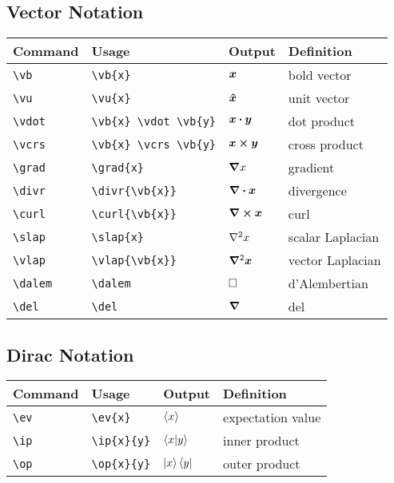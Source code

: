 \documentclass[11pt]{article}
\begin{document}
\subsection{Vector Notation}

\begin{tabular}{llll}
    Command       & Usage                      & Output                & Definition       \\
    \hline
    \verb|\vb|    & \verb|\vb{x}|              & $\bm{x}$              & bold vector      \\
    \verb|\vu|    & \verb|\vu{x}|              & $\bm{\hat{x}}$              & unit vector      \\
    \verb|\vdot|  & \verb|\vb{x} \vdot \vb{y}| & $\bm{x} \bm{\cdot} \bm{y}$ & dot product      \\
    \verb|\vcrs|  & \verb|\vb{x} \vcrs \vb{y}| & $\bm{x} \bm{\times} \bm{y}$ & cross product    \\
    \verb|\grad|  & \verb|\grad{x}|            & $\bm{\nabla} x$            & gradient         \\
    \verb|\divr|  & \verb|\divr{\vb{x}}|       & $\bm{\nabla} \bm{\cdot} \bm{x}$       & divergence       \\
    \verb|\curl|  & \verb|\curl{\vb{x}}|       & $\bm{\nabla} \bm{\times} \bm{x}$       & curl             \\
    \verb|\slap|  & \verb|\slap{x}|            & $\nabla^2 x$            & scalar Laplacian \\
    \verb|\vlap|  & \verb|\vlap{\vb{x}}|       & $\bm{\nabla}^2 \bm{x}$       & vector Laplacian \\
    \verb|\dalem| & \verb|\dalem|              & $\dalem$              & d'Alembertian    \\
    \verb|\del|   & \verb|\del|                & $\bm{\nabla}$                & del              \\
\end{tabular}

\subsection{Dirac Notation}

\begin{tabular}{llll}
    Command    & Usage            & Output      & Definition        \\
    \hline
    \verb|\ev| & \verb|\ev{x}|    & $\braket{x}$    & expectation value \\
    \verb|\ip| & \verb|\ip{x}{y}| & $\braket{x|y}$ & inner product     \\
    \verb|\op| & \verb|\op{x}{y}| & $\ket{x}\bra{y}$ & outer product     \\
\end{tabular}
\end{document}
